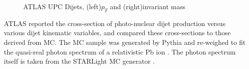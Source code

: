 \begin{figure}[h!]
    \centering
    \qquad
    \caption{ATLAS UPC Dijets, (left)$p_T$ and (right)invariant mass \cite{Donnachie:2002en}}%
    \label{fig:exampleDijetAtlas}%
\end{figure}

ATLAS reported the cross-section of photo-nuclear dijet production versus various dijet kinematic variables, and compared these cross-sections to those derived from MC. The MC sample was generated by Pythia and re-weighed to fit the quasi-real photon spectrum of a relativistic Pb ion \cite{pythia}. The photon spectrum itself is taken from the STARLight MC generator \cite{Crittenden:1997yz}\cite{starlight}.
